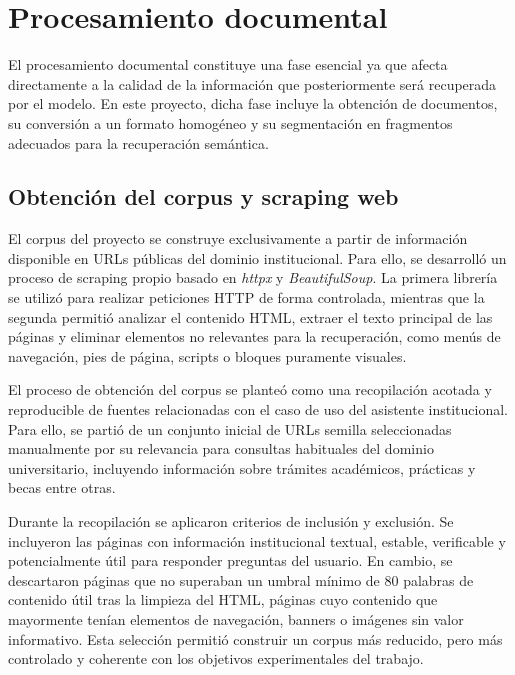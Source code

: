 \section{Procesamiento documental}\label{sec:procesamiento-documental}

El procesamiento documental constituye una fase esencial ya que afecta directamente a la calidad de la información que posteriormente será recuperada por el modelo. 
En este proyecto, dicha fase incluye la obtención de documentos, su conversión a un formato homogéneo y su segmentación en fragmentos adecuados para la recuperación semántica.

\subsection{Obtención del corpus y scraping web}\label{subsec:obtencion-corpus}

El corpus del proyecto se construye exclusivamente a partir de información disponible en URLs públicas del dominio institucional. 
Para ello, se desarrolló un proceso de scraping propio basado en \textit{httpx} y \textit{BeautifulSoup}. 
La primera librería se utilizó para realizar peticiones HTTP de forma controlada, mientras que la segunda permitió analizar el contenido HTML, extraer el texto principal de las páginas y eliminar elementos no relevantes para la recuperación, como menús de navegación, pies de página, scripts o bloques puramente visuales.

El proceso de obtención del corpus se planteó como una recopilación acotada y reproducible de fuentes relacionadas con el caso de uso del asistente institucional. 
Para ello, se partió de un conjunto inicial de URLs semilla seleccionadas manualmente por su relevancia para consultas habituales del dominio universitario, incluyendo información sobre trámites académicos, prácticas y becas entre otras.

Durante la recopilación se aplicaron criterios de inclusión y exclusión. 
Se incluyeron las páginas con información institucional textual, estable, verificable y potencialmente útil para responder preguntas del usuario. 
En cambio, se descartaron páginas que no superaban un umbral mínimo de 80 palabras de contenido útil tras la limpieza del HTML, páginas cuyo contenido que mayormente tenían elementos de navegación, banners o imágenes sin valor informativo. 
Esta selección permitió construir un corpus más reducido, pero más controlado y coherente con los objetivos experimentales del trabajo.

